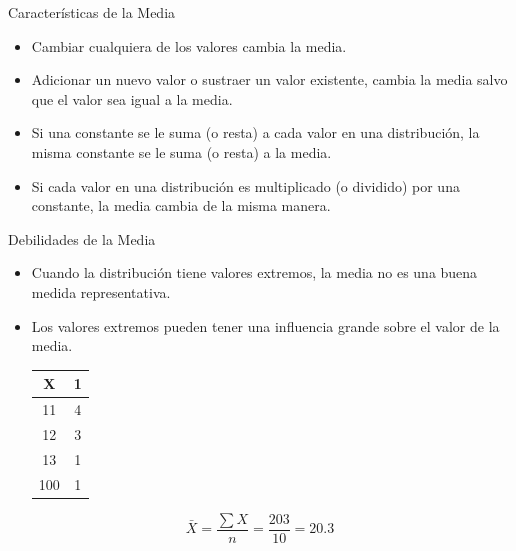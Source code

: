 \documentclass[xcolor=dvipsnames]{beamer}
\begin{document}
	\begin{frame}{Características de la Media}
		\begin{itemize}
			\justifying
			\item Cambiar cualquiera de los valores cambia la media.
			\item Adicionar un nuevo valor o sustraer un valor existente, cambia	la media salvo que el valor sea igual a la media.
			\item Si una constante se le suma (o resta) a cada valor en una distribución, la misma constante se le suma (o resta) a la media.
			\item Si cada valor en una distribución es multiplicado (o dividido) por una constante, la media cambia de la misma manera. 
		\end{itemize}
	\end{frame}
	
	\begin{frame}{Debilidades de la Media }
		
		\begin{itemize}
			\justifying
			\item Cuando la distribución tiene valores extremos, la media no es una buena medida representativa.
			\item Los valores extremos pueden tener una influencia grande sobre el valor de la media.
			
			\begin{center}
				\begin{table}[H]
					\begin{tabular}{cc}
						X & 1 \\ \hline
						11 & 4\\
						12 & 3 \\
						13 & 1 \\
						100 & 1 \\
					\end{tabular}
				\end{table}
			\end{center}
		\end{itemize}
		$$\bar{X}=\dfrac{\sum{X}}{n}=\dfrac{203}{10}=20.3$$
	\end{frame}
	
\end{document}
